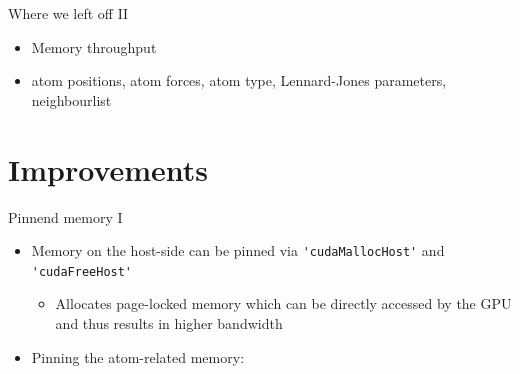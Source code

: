 \documentclass[12pt,xcolor={rgb},t]{beamer}
\begin{document}
\begin{frame}[fragile]{Where we left off II}
    
    \lstset{breaklines=true, breakatwhitespace=true}

    \begin{itemize}
        \item Memory throughput
        \vspace*{1.5em}
        \begin{figure}[!H]
            \centering
        \end{figure}
        \vspace*{1.5em}
        \item atom positions, atom forces, atom type, Lennard-Jones parameters, neighbourlist
    \end{itemize}

\end{frame}

\section{Improvements}


\begin{frame}[fragile]{Pinnend memory I}

    \begin{itemize}
        \item Memory on the host-side can be pinned via \lstinline{'cudaMallocHost'} and \lstinline{'cudaFreeHost'}
        \begin{itemize}
            \item Allocates page-locked memory which can be directly accessed by the GPU and thus
            results in higher bandwidth
        \end{itemize}
        \item Pinning the atom-related memory:
        \vspace*{0.65em}
        \begin{figure}[!H]
            \centering
        \end{figure}
    \end{itemize}

\end{frame}
\end{document}
